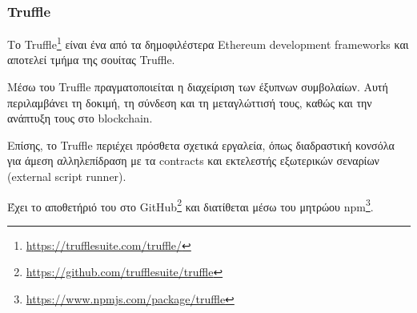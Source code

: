 \subsubsection{Truffle} \label{subsection:4-2-3-1-truffle}


Το Truffle\footnote{\url{https://trufflesuite.com/truffle/}} είναι ένα από τα δημοφιλέστερα Ethereum development frameworks και αποτελεί τμήμα της σουίτας Truffle.

Μέσω του Truffle πραγματοποιείται η διαχείριση των έξυπνων συμβολαίων. Αυτή περιλαμβάνει τη δοκιμή, τη σύνδεση και τη μεταγλώττισή τους, καθώς και την ανάπτυξη τους στο blockchain.

Επίσης, το Truffle περιέχει πρόσθετα σχετικά εργαλεία, όπως διαδραστική κονσόλα για άμεση αλληλεπίδραση με τα contracts  και εκτελεστής εξωτερικών σεναρίων (external script runner). 

Έχει το αποθετήριό του στο GitHub\footnote{\url{https://github.com/trufflesuite/truffle}} και διατίθεται μέσω του μητρώου npm\footnote{\url{https://www.npmjs.com/package/truffle}}.